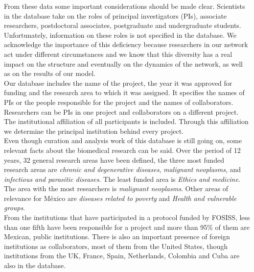 \documentclass[11pt]{article}
\begin{document}
From these data some important considerations should be made
clear. Scientists in the database take on the roles of principal
investigators (PIs), associate researchers, postdoctoral associates,
postgraduate and undergraduate students.
Unfortunately, information on these roles is not specified in the database.
We acknowledge the importance of this deficiency because
researchers in our network act under different circumstances and we know
that this diversity has a real impact on the structure and eventually on the
dynamics of the network, as well as on the results of our model.\\  

Our database includes the
name of the project, the year it was approved for funding and the research area
to which it was assigned. It specifies the names of PIs or the people 
responsible for the project and the names of collaborators.
Researchers can be PIs in one project and collaborators on a different project. The institutional
affiliation of all participants is included. Through this affiliation
we determine the principal institution
behind every project.\\ 

Even though curation and analysis work of this database is still going on, some
relevant facts about the biomedical research can be said. Over the period of 12
years, 32 general research areas have been defined, the three most funded
research areas are \emph{chronic and degenerative diseases}, \emph{malignant
  neoplasms}, and \emph{infectious and parasitic diseases}. The least funded
area is \emph{Ethics and medicine}. The area with the most researchers is
\emph{malignant neoplasms}. Other areas of relevance for M\'exico are
\emph{diseases related to poverty} and \emph{Health and vulnerable groups}. \\  

From the institutions that have participated in a protocol funded by FOSISS,
less than one fifth have been responsible for a project and more than 95\% of
them are Mexican, public institutions. There is also an important presence of
foreign institutions as collaborators, most of them from the United States,
though institutions from the UK, France, Spain, Netherlands, Colombia and Cuba
are also in the database.\\ 
\end{document}
